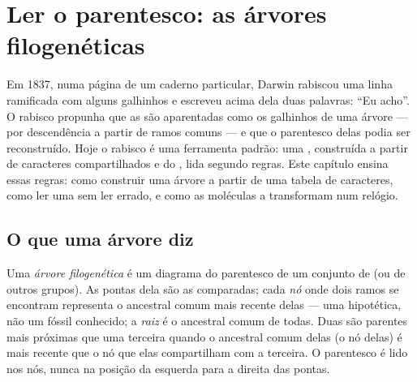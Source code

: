 \chapter{Ler o parentesco: as árvores filogenéticas}\label{ch:g12:phylogenetic-trees}

Em 1837, numa página de um caderno particular, Darwin rabiscou uma
linha ramificada com alguns galhinhos e escreveu acima dela duas
palavras: ``Eu acho''. O rabisco propunha que as  são
aparentadas como os galhinhos de uma árvore --- por descendência a
partir de ramos comuns --- e que o parentesco delas podia ser
reconstruído. Hoje o rabisco é uma ferramenta padrão: uma , construída a partir de caracteres compartilhados e do
, lida segundo regras. Este capítulo ensina essas regras: como
construir uma árvore a partir de uma tabela de caracteres, como ler uma
sem ler errado, e como as moléculas a transformam num relógio.

\section{O que uma árvore diz}

\begin{definition}\label{def:g12:phylogenetic-trees:tree}
Uma \emph{árvore filogenética} é um diagrama
do parentesco de um conjunto de  (ou de outros grupos). As
pontas dela são as  comparadas; cada \emph{nó} onde dois ramos
se encontram representa o ancestral comum mais recente delas --- uma
 hipotética, não um fóssil conhecido; a \emph{raiz} é o
ancestral comum de todas. Duas  são parentes mais próximas que
uma terceira quando o ancestral comum delas (o nó delas) é mais recente
que o nó que elas compartilham com a terceira. O parentesco é lido nos
nós, nunca na posição da esquerda para a direita das pontas.
\end{definition}

